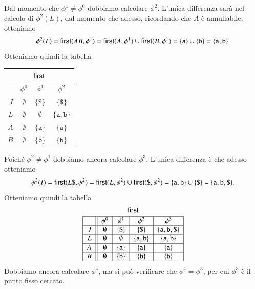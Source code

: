 %
Dal momento che $\phi^1\not=\phi^0$ dobbiamo calcolare $\phi^2$. L'unica
differenza sar\`a nel calcolo di $\phi^2(L)$, dal momento che adesso,
ricordando che $A$ \`e annullabile, otteniamo
\[
  \phi^2(L)=\mathsf{first}(AB,\phi^1)=\mathsf{first}(A,\phi^1)\cup\mathsf{first}(B,\phi^1)=
    \{\mathtt{a}\}\cup\{\mathtt{b}\}=\{\mathtt{a},\mathtt{b}\}.
\]
Otteniamo quindi la tabella
%
\begin{center}
\begin{tabular}{|r||c|c|c|}
\multicolumn{4}{c}{$\mathsf{first}$}\\\hline\hline
    & $\phi^0$ & $\phi^1$ & $\phi^2$\\\hline
$I$ & $\emptyset$ & $\{\mathtt{\$}\}$ & $\{\mathtt{\$}\}$\\\hline
$L$ & $\emptyset$ & $\emptyset$ & $\{\mathtt{a},\mathtt{b}\}$ \\\hline
$A$ & $\emptyset$ & $\{\mathtt{a}\}$ & $\{\mathtt{a}\}$ \\\hline
$B$ & $\emptyset$ & $\{\mathtt{b}\}$ & $\{\mathtt{b}\}$ \\\hline
\end{tabular}
\end{center}
%
Poich\'e $\phi^2\not=\phi^1$ dobbiamo ancora calcolare $\phi^3$. L'unica
differenza \`e che adesso otteniamo
\[
  \phi^3(I)=\mathsf{first}(L\mathtt{\$},\phi^2)=\mathsf{first}(L,\phi^2)\cup
    \mathsf{first}(\mathtt{\$},\phi^2)=\{\mathtt{a},\mathtt{b}\}\cup\{\mathtt{\$}\}
    =\{\mathtt{a},\mathtt{b},\mathtt{\$}\}.
\]
Otteniamo quindi la tabella
%
\begin{equation}\label{tab:grammar_lists_first}
\mbox{
\begin{tabular}{|r||c|c|c|c|}
\multicolumn{5}{c}{$\first$}\\\hline\hline
    & $\phi^0$ & $\phi^1$ & $\phi^2$ & $\phi^3$ \\\hline
$I$ & $\emptyset$ & $\{\mathtt{\$}\}$ & $\{\mathtt{\$}\}$ & $\{\mathtt{a},\mathtt{b},\mathtt{\$}\}$ \\\hline
$L$ & $\emptyset$ & $\emptyset$ & $\{\mathtt{a},\mathtt{b}\}$ & $\{\mathtt{a},\mathtt{b}\}$ \\\hline
$A$ & $\emptyset$ & $\{\mathtt{a}\}$ & $\{\mathtt{a}\}$ & $\{\mathtt{a}\}$ \\\hline
$B$ & $\emptyset$ & $\{\mathtt{b}\}$ & $\{\mathtt{b}\}$ & $\{\mathtt{b}\}$ \\\hline
\end{tabular}
}
\end{equation}
%
Dobbiamo ancora calcolare $\phi^4$, ma si pu\`o verificare che $\phi^4=\phi^3$,
per cui $\phi^3$ \`e il punto fisso cercato.

